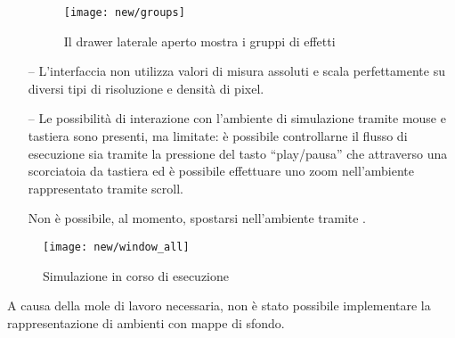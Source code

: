 \begin{itemize}
                      \begin{figure}[htbp]
                          \centering
                          \texttt{[image: new/groups]}
                          \caption{Il drawer laterale aperto mostra i gruppi di effetti}
                          \label{fig:simWithEff}
                      \end{figure}

                  \item[--]
                      L'interfaccia non utilizza valori di misura assoluti e scala perfettamente su diversi tipi di risoluzione e densità di pixel.

                  \item[--]
                      Le possibilità di interazione con l'ambiente di simulazione tramite mouse e tastiera sono presenti, ma limitate: è possibile controllarne il flusso di esecuzione sia tramite la pressione del tasto ``play/pausa'' che attraverso una scorciatoia da tastiera ed è possibile effettuare uno zoom nell'ambiente rappresentato tramite scroll.

                      Non è possibile, al momento, spostarsi nell'ambiente tramite .
                \end{itemize}

                \begin{figure}[htbp]
                    \centering
                    \texttt{[image: new/window\_all]}
                    \caption{Simulazione in corso di esecuzione}
                    \label{fig:simWithNodes}
                \end{figure}

                A causa della mole di lavoro necessaria, non è stato possibile implementare la rappresentazione di ambienti con mappe di sfondo.
